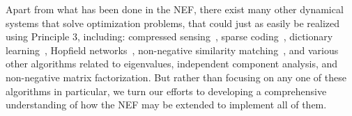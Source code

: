 Apart from what has been done in the NEF, there exist many other dynamical systems that solve optimization problems, that could just as easily be realized using Principle 3, including:
compressed sensing~\citep{kim2007interior},
sparse coding~\citep[LASSO;][]{shapero2014optimal, tang2017sparse},
dictionary learning~\citep{lin2018dictionary},
Hopfield networks~\citep{hopfield1982, frady2019robust},
non-negative similarity matching~\citep{pehlevan2019spiking},
and various other algorithms related to eigenvalues,
independent component analysis,
and non-negative matrix factorization.
But rather than focusing on any one of these algorithms in particular, we turn our efforts to developing a comprehensive understanding of how the NEF may be extended to implement all of them.

